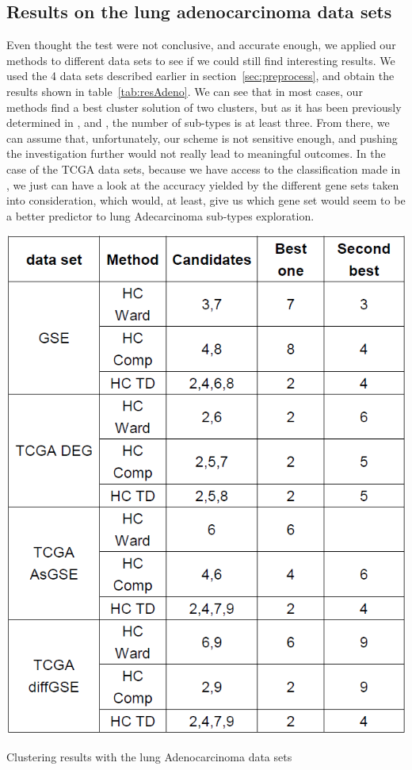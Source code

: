 \documentclass[twocolumn,12pt]{article}
\begin{document}
\subsection{Results on the lung adenocarcinoma data sets}

Even thought the test were not conclusive, and accurate enough, we applied our methods to different data sets to see if we could still find interesting results.
We used the 4 data sets described earlier in section~\ref{sec:preprocess}, and obtain the results shown in table~\ref{tab:resAdeno}.
We can see that in most cases, our methods find a best cluster solution of two clusters, but as it has been previously determined in \cite{hayes}, \cite{wilk} and \cite{TCGA}, the number of sub-types is at least three. From there, we can assume that, unfortunately, our scheme is not sensitive enough, and pushing the investigation further would not really lead to meaningful outcomes.
In the case of the TCGA data sets, because we have access to the classification made in \cite{TCGA}, we just can have a look at the accuracy yielded by the different gene sets taken into consideration, which would, at least, give us which gene set would seem to be a better predictor to lung Adecarcinoma sub-types exploration.
\begin{table}[!]
    \centering
    \includegraphics[scale=0.4]{img/ResultsAdeno.png}
    \caption{Clustering results with the lung Adenocarcinoma data sets}
    \label{tab:resAdeno}
\end{table}
\end{document}
